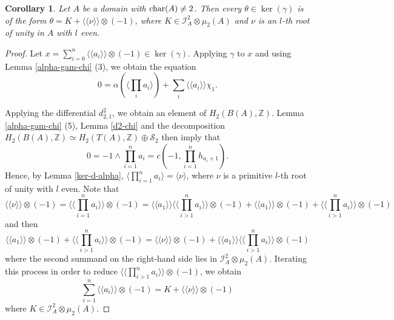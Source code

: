 \documentclass[11pt]{amsart}
\theoremstyle{definition}
\theoremstyle{plain}
\newtheorem{cor}[ntn]{Corollary}
\numberwithin{equation}{section}
\newcommand{\z}{\mathbb{Z}}
\newcommand{\II}{\mathcal{I}}
\renewcommand{\SS}{\mathcal{S}}
\newcommand{\lan}{\langle}
\newcommand{\ran}{\rangle}
\newcommand{\Lan}{\langle \! \langle}
\newcommand{\Ran}{\rangle \! \rangle}
\renewcommand{\char}{{\rm char}}
\begin{document}
\begin{cor}\label{ker-gam}
    Let $A$ be a domain with $\char(A)\neq 2$. Then every $\theta\in\ker(\gamma)$ is of the form $\theta=K+\Lan \nu\Ran\otimes(-1)$, where $K\in\II^2_A\otimes\mu_2(A)$ and $\nu$ is an $l$-th root of unity in $A$ with $l$ even.
\end{cor}
\begin{proof}
    Let $x=\displaystyle\sum_{i=0}^n\Lan a_i\Ran\otimes(-1)\in\ker(\gamma)$. Applying $\gamma$ to $x$ and using Lemma \ref{alpha-gam-chi} (3), we obtain the equation
    \[
        0=\alpha(\lan\prod_i a_i\ran)+\sum_i\Lan a_i\Ran\chi_1.
    \]
    
    Applying the differential $d^2_{2,1}$, we obtain an element of $H_2(B(A),\z)$. Lemma \ref{alpha-gam-chi} (5), Lemma \ref{d2-chi} and the decomposition $H_2(B(A),\z)\simeq H_2(T(A),\z)\oplus \SS_2$ then imply that
    \[
        0=-1\wedge\prod_{i=1}^na_i=c(-1,\prod_{i=1}^nh_{a_i+1}).
    \]
    Hence, by Lemma \ref{ker-d-alpha}, $\displaystyle\lan\prod_{i=1}^na_i\ran=\lan\nu\ran$, where $\nu$ is a primitive $l$-th root of unity with $l$ even. Note that
    \[
        \Lan\nu\Ran\otimes(-1)=\Lan\prod_{i=1}^na_i\Ran\otimes(-1)=\Lan a_1\Ran\Lan\prod_{i>1}^na_i\Ran\otimes(-1)+\Lan a_1\Ran\otimes(-1)+\Lan\prod_{i>1}^na_i\Ran\otimes(-1)
    \]
    and then
    \[
        \Lan a_1\Ran\otimes(-1)+\Lan\prod_{i>1}^na_i\Ran\otimes(-1)=\Lan\nu\Ran\otimes(-1)+\Lan a_1\Ran\Lan\prod_{i>1}^na_i\Ran\otimes(-1)
    \]
    where the second summand on the right-hand side lies in $\II^2_A\otimes\mu_2(A)$. Iterating this process in order to reduce $\displaystyle\Lan\prod_{i>1}^na_i\Ran\otimes(-1)$, we obtain
    \[
        \sum_{i=1}^n\Lan a_i\Ran\otimes(-1)=K+\Lan\nu\Ran\otimes(-1)
    \]
    where $K\in \II^2_A\otimes\mu_2(A)$.
\end{proof}
\end{document}
